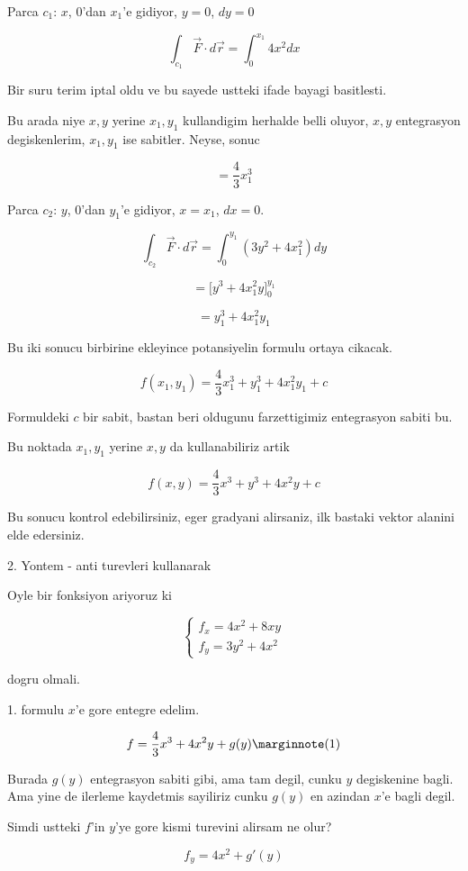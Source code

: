 \documentclass[12pt,fleqn]{article}\usepackage{../common}
\begin{document}
Parca $c_1$: $x$, 0'dan $x_1$'e gidiyor, $y=0$, $dy = 0$

\[ \int_{c_1} \vec{F} \cdot d\vec{r} = 
\int_0^{x_1} 4x^2 dx 
\]

Bir suru terim iptal oldu ve bu sayede ustteki ifade bayagi basitlesti. 

Bu arada niye $x,y$ yerine $x_1,y_1$ kullandigim herhalde belli oluyor,
$x,y$ entegrasyon degiskenlerim, $x_1,y_1$ ise sabitler. Neyse, sonuc

\[ = \frac{4}{3} x_1^3\]

Parca $c_2$: $y$, 0'dan $y_1$'e gidiyor, $x=x_1$, $dx = 0$. 

\[ \int_{c_2} \vec{F} \cdot d\vec{r} = 
\int_0^{y_1} (3y^2 + 4x_1^2) dy
\]

\[ = \bigg[ y^3 + 4x_1^2y \bigg]_0^{y_1} \]


\[ = y_1^3 + 4x_1^2y_1 \]

Bu iki sonucu birbirine ekleyince potansiyelin formulu ortaya cikacak.

\[ f(x_1,y_1) = \frac{4}{3} x_1^3 + y_1^3 + 4x_1^2y_1 + c\]

Formuldeki $c$ bir sabit, bastan beri oldugunu farzettigimiz entegrasyon
sabiti bu. 

Bu noktada $x_1,y_1$ yerine $x,y$ da kullanabiliriz artik

\[ f(x,y) = \frac{4}{3} x^3 + y^3 + 4x^2y + c\]

Bu sonucu kontrol edebilirsiniz, eger gradyani alirsaniz, ilk bastaki
vektor alanini elde edersiniz. 

2. Yontem - anti turevleri kullanarak

Oyle bir fonksiyon ariyoruz ki 

\[ 
\left\{ \begin{array}{l}
f_x = 4x^2 + 8xy \\
f_y = 3y^2 + 4x^2
\end{array} \right.
 \]

dogru olmali. 

1. formulu $x$'e gore entegre edelim. 

\[ f = \frac{4}{3}x^3 + 4x^2y + g(y)
\mlabel{1}\]

Burada $g(y)$ entegrasyon sabiti gibi, ama tam degil, cunku $y$ degiskenine
bagli. Ama yine de ilerleme kaydetmis sayiliriz cunku $g(y)$ en azindan
$x$'e bagli degil. 

Simdi ustteki $f$'in $y$'ye gore kismi turevini alirsam ne olur? 

\[ f_y = 4x^2 + g'(y) \]
\end{document}
